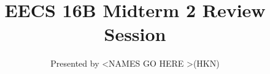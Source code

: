 

\title{EECS 16B Midterm 2 Review Session}
\author{Presented by \textless NAMES GO HERE \textgreater (HKN)}
\date{}

\newcommand{\SlideAccessingLogistics}{@\#}















